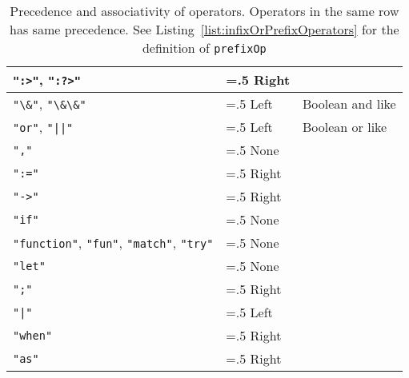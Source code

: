 \begin{table}
\begin{tabularx}{\linewidth}{|>{\hsize=1\hsize\raggedright\arraybackslash}X|>{\hsize=.5\hsize}X|>{\hsize=1.5\hsize}X|}
     \hline
    \mbox{\lstinline[language=ebnf]|":>"|,} \mbox{\lstinline[language=ebnf]|":?>"|} & Right & \\
     \hline
    \mbox{\lstinline[language=ebnf]|"\&"|,} \mbox{\lstinline[language=ebnf]|"\&\&"|} & Left & Boolean and like\\
     \hline
    \mbox{\lstinline[language=ebnf]|"or"|,} \mbox{\lstinline[language=ebnf]!"||"!} & Left & Boolean or like\\
     \hline
     \lstinline[language=ebnf]|","| & None & \\
     \hline
     \lstinline[language=ebnf]|":="| & Right & \\
     \hline
     \lstinline[language=ebnf]|"->"| & Right & \\
     \hline
    \lstinline[language=ebnf]|"if"| & None & \\
     \hline
    \mbox{\lstinline[language=ebnf]|"function"|,} \mbox{\lstinline[language=ebnf]|"fun"|,} \mbox{\lstinline[language=ebnf]|"match"|,} \mbox{\lstinline[language=ebnf]|"try"|}& None & \\
     \hline
     \lstinline[language=ebnf]|"let"| & None & \\
     \hline
     \lstinline[language=ebnf]|";"| & Right & \\
     \hline
     \lstinline[language=ebnf]!"|"! & Left & \\
     \hline
     \lstinline[language=ebnf]|"when"| & Right & \\
     \hline
     \lstinline[language=ebnf]|"as"| & Right & \\
     \hline
  \end{tabularx}
  \caption{Precedence and associativity of operators. Operators in the same row has same precedence. See Listing~\ref{list:infixOrPrefixOperators} for the definition of \lstinline!prefixOp!}
  \label{tab:operatorPrecedence}
\end{table}

